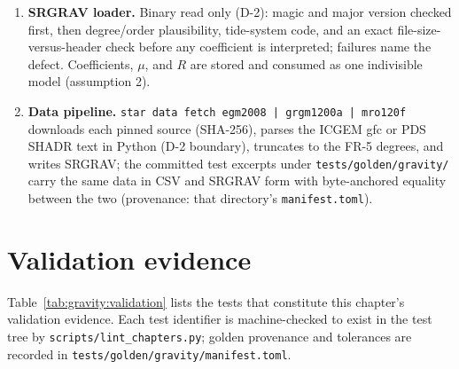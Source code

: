 \begin{enumerate}
    total and IEEE-754 gradual underflow (guaranteed by the D-10 flags)
    keeps the result deterministic.
  \item \textbf{SRGRAV loader.} Binary read only (D-2): magic and major
    version checked first, then degree/order plausibility, tide-system
    code, and an exact file-size-versus-header check before any
    coefficient is interpreted; failures name the defect. Coefficients,
    $\mu$, and $R$ are stored and consumed as one indivisible model
    (assumption 2).
  \item \textbf{Data pipeline.} \texttt{star data fetch egm2008 |
    grgm1200a | mro120f} downloads each pinned source (SHA-256), parses
    the ICGEM gfc or PDS SHADR text in Python (D-2 boundary), truncates
    to the FR-5 degrees, and writes SRGRAV; the committed test excerpts
    under \texttt{tests/golden/gravity/} carry the same data in CSV and
    SRGRAV form with byte-anchored equality between the two
    (provenance: that directory's \texttt{manifest.toml}).
\end{enumerate}

\section{Validation evidence}
\label{sec:gravity:validation}

Table~\ref{tab:gravity:validation} lists the tests that constitute this
chapter's validation evidence. Each test identifier is machine-checked
to exist in the test tree by \texttt{scripts/lint\_chapters.py}; golden
provenance and tolerances are recorded in
\texttt{tests/golden/gravity/manifest.toml}.

